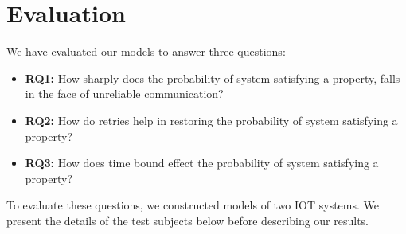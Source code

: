 \section{Evaluation}
We have evaluated our models to answer three questions:
\begin{itemize}
  \item \textbf{RQ1:} How sharply does the probability of system satisfying a property, falls in the face of unreliable communication?
  \item \textbf{RQ2:} How do retries help in restoring the probability of system satisfying a property?
  \item \textbf{RQ3:} How does time bound effect the probability of system satisfying a property?
\end{itemize}

To evaluate these questions, we constructed models of two IOT systems. We present the details of the test subjects below before describing our results.








